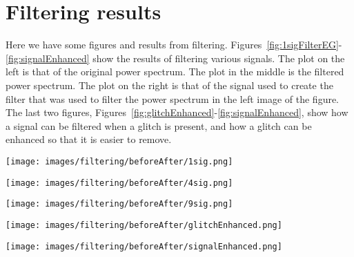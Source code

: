 \documentclass[%
reprint,
amsmath,amssymb,
aps,
]{revtex4-1}
\begin{document}
	
	
	\appendix
	\section{Filtering results}
	Here we have some figures and results from filtering. Figures~\ref{fig:1sigFilterEG}-\ref{fig:signalEnhanced} show the results of filtering various signals. The plot on the left is that of the original power spectrum. The plot in the middle is the filtered power spectrum. The plot on the right is that of the signal used to create the filter that was used to filter the power spectrum in the left image of the figure. The last two figures, Figures~\ref{fig:glitchEnhanced}-\ref{fig:signalEnhanced}, show how a signal can be filtered when a glitch is present, and how a glitch can be enhanced so that it is easier to remove. 
	
	
	\begin{figure*}[h]
		\centering
		\texttt{[image: images/filtering/beforeAfter/1sig.png]}
		\caption{\textit{description of plot:} plot of }
		\label{fig:1sigFilterEG}
	\end{figure*}
	
	\begin{figure*}[h]
		\centering
		\texttt{[image: images/filtering/beforeAfter/4sig.png]}
		\caption{\textit{description of plot:} plot of }
		\label{fig:4sigFilterEG}
	\end{figure*}
	
	\begin{figure*}[h]
		\centering
		\texttt{[image: images/filtering/beforeAfter/9sig.png]}
		\caption{\textit{description of plot:} plot of }
		\label{fig:9sigFilterEG}
	\end{figure*}
	
	\begin{figure*}[h]
		\centering
		\texttt{[image: images/filtering/beforeAfter/glitchEnhanced.png]}
		\caption{\textit{description of plot:} plot of }
		\label{fig:glitchEnhanced}
	\end{figure*}
	
	\begin{figure*}[h]
		\centering
		\texttt{[image: images/filtering/beforeAfter/signalEnhanced.png]}
		\caption{\textit{description of plot:} plot of }
		\label{fig:signalEnhanced}
	\end{figure*}
	
	
	
	\clearpage
	
		
		
	
\end{document}

